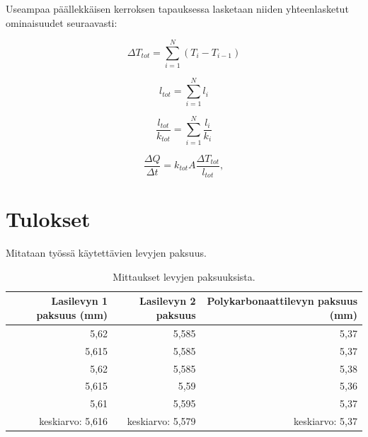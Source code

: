 \documentclass[a4paper,11pt]{article}
\begin{document}
Useampaa päällekkäisen kerroksen tapauksessa lasketaan niiden yhteenlasketut ominaisuudet seuraavasti: 

\begin{equation}
  \Delta T_{tot} = \sum_{i=1}^N (T_i - T_{i-1})
\end{equation}

\begin{equation}
  l_{tot} = \sum_{i=1}^N l_i
\end{equation}

\begin{equation}
  \label{kerrosjohtavuus}
  \frac{l_{tot}}{k_{tot}} = \sum_{i=1}^N \frac{l_i}{k_i}
\end{equation}

\begin{equation}
  \frac{\Delta Q}{\Delta t} = k_{tot} A \frac{\Delta T_{tot}}{l_{tot}} ,
\end{equation}

\section{Tulokset}

Mitataan työssä käytettävien levyjen paksuus. 
\begin{table}[H]
\begin{center}
\caption{Mittaukset levyjen paksuuksista.}
\begin{tabular}{ | r | r | r | }
  \hline 
  Lasilevyn 1 paksuus (mm) & Lasilevyn 2 paksuus & Polykarbonaattilevyn paksuus (mm) \\ \hline
  5,62 & 5,585 & 5,37 \\ \hline
  5,615 & 5,585 & 5,37 \\ \hline
  5,62 & 5,585 & 5,38 \\ \hline
  5,615 & 5,59 & 5,36 \\ \hline
  5,61 & 5,595 & 5,37 \\ \hline
  keskiarvo: 5,616 & keskiarvo: 5,579 & keskiarvo: 5,37 \\ \hline
\end{tabular}
\end{center}
\end{table}
\end{document}
